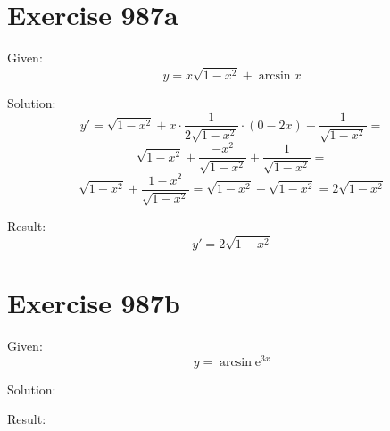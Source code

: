 \documentclass[a4paper, 10pt]{scrartcl}
\newcommand*\euler{\mathrm{e}}
\begin{document}
\section{Exercise 987a}

Given:
\[
y = x\sqrt{1 - x^{2}} + \arcsin{x}
\]

Solution:
\[
y' = \sqrt{1 - x^{2}} + x\cdot\frac{1}{2\sqrt{1 - x^{2}}}\cdot(0 - 2x) + \frac{1}{\sqrt{1 - x^{2}}} =
\]
\[
\sqrt{1 - x^{2}} + \frac{-x^{2}}{\sqrt{1 - x^{2}}} + \frac{1}{\sqrt{1 - x^{2}}} =
\]
\[
\sqrt{1 - x^{2}} + \frac{1 -x^{2}}{\sqrt{1 - x^{2}}} = \sqrt{1 - x^{2}} + \sqrt{1 - x^{2}} = 2\sqrt{1 - x^{2}}
\]

Result:
\[
y' = 2\sqrt{1 - x^{2}}
\]

\section{Exercise 987b}

Given:
\[
y = \arcsin{\euler^{3x}}
\]

Solution:

Result:
\end{document}
